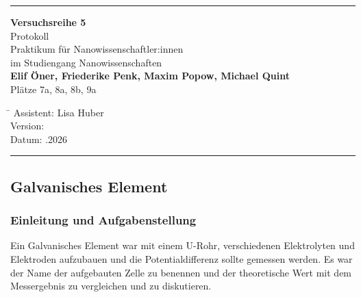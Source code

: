 \documentclass[
	a4paper,										%
	12pt,											%
	twoside,										%
	headsepline,								%
	footsepline,									%
	captions=tableheading,					%
]{scrartcl}
\begin{document}
	
	\begin{titlepage}
		\begin{center}
			\hrule													%
			\vspace*{5cm}
			\Huge {\textbf {Versuchsreihe 5}}\\						%
			\vspace*{0.5cm}
			\vspace*{1cm}
			\normalsize
			Protokoll	\\									
			Praktikum für Nanowissenschaftler:innen\\
			im Studiengang Nanowissenschaften\\
			\vspace*{0.5cm}
			\Large {\textbf{Elif Öner, Friederike Penk, Maxim Popow, Michael Quint}}		\\						%
			\vspace*{0.5cm}
					\normalsize{Plätze 7a, 8a, 8b, 9a}								%
			\vfill
		\end{center}
		\begin{tabbing}
			\hspace{3cm}\=\kill
			Assistent: \> Lisa Huber \\						%
			Version:  \\									%
			Datum: .2026 \\								%
		\end{tabbing}
		\hrule														%
\end{titlepage}

\setcounter{page}{1}
\setcounter{section}{5}								%
\setcounter{subsection}{0}							%
\setcounter{secnumdepth}{4}
	
\subsection{Galvanisches Element}

\subsubsection{Einleitung und Aufgabenstellung}
Ein Galvanisches Element war mit einem U-Rohr, verschiedenen Elektrolyten und Elektroden aufzubauen und die Potentialdifferenz sollte gemessen werden.
Es war der Name der aufgebauten Zelle zu benennen und der theoretische Wert mit dem Messergebnis zu vergleichen und zu diskutieren.
\end{document}
